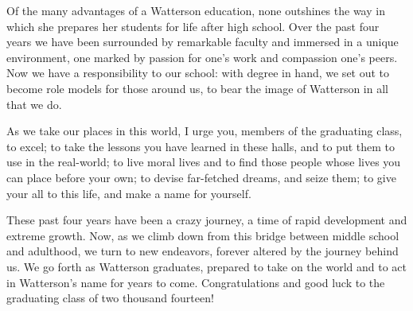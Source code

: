 \documentclass{report}
\begin{document}
Of the many advantages of a Watterson education, none outshines the way in
which she prepares her students for life after high school. Over the past four
years we have been surrounded by remarkable faculty and immersed in a unique
environment, one marked by passion for one's work and compassion one's peers.
Now we have a responsibility to our school: with degree in hand, we set out to
become role models for those around us, to bear the image of Watterson in all
that we do.

As we take our places in this world, I urge you, members of the graduating
class, to excel; to take the lessons you have learned in these halls, and to
put them to use in the real-world; to live moral lives and to find those people
whose lives you can place before your own; to devise far-fetched dreams, and
seize them; to give your all to this life, and make a name for yourself.

These past four years have been a crazy journey, a time of rapid development
and extreme growth. Now, as we climb down from this bridge between middle
school and adulthood, we turn to new endeavors, forever altered by the journey
behind us. We go forth as Watterson graduates, prepared to take on the world
and to act in Watterson's name for years to come. Congratulations and good luck
to the graduating class of two thousand fourteen!
\end{document}
